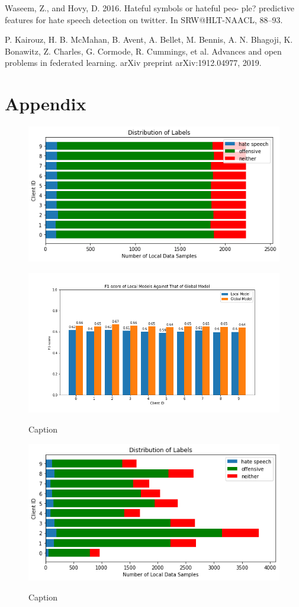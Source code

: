 \documentclass[letterpaper]{article} %
\begin{document}
Waseem, Z., and Hovy, D. 2016. Hateful symbols or hateful peo-
ple? predictive features for hate speech detection on twitter. In
SRW@HLT-NAACL, 88–93.

P. Kairouz, H. B. McMahan, B. Avent, A. Bellet, M. Bennis, A. N.
Bhagoji, K. Bonawitz, Z. Charles, G. Cormode, R. Cummings, et al.
Advances and open problems in federated learning. arXiv preprint
arXiv:1912.04977, 2019.
\clearpage
\section{Appendix}
\begin{figure}[hbt!]
{\includegraphics[width=\columnwidth]{iid_distribution_of_labels_7}}
\caption{}
\end{figure}
\begin{figure}[hbt!]
{\includegraphics[width=\columnwidth]{iid_seed_7performance_of_models_on_client_data_f1score}}
\caption{Caption}
\end{figure}
\begin{figure}[hbt!]
{\includegraphics[width=\columnwidth]{iid-quantity-skew_distribution_of_labels_5}}
\caption{Caption}
\end{figure}
\end{document}
